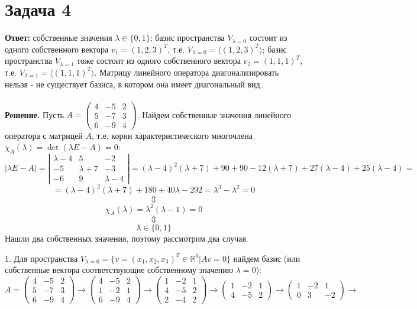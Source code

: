 \documentclass{article}
\begin{document}
\section*{Задача 4}
{\bf Ответ:} собственные значения $\lambda \in \{0, 1\}$; базис пространства $V_{\lambda=0}$ состоит из одного собственного вектора $v_1=(1,2,3)^T$, т.е.  $V_{\lambda=0}=\langle(1,2,3)^T\rangle$; базис пространства $V_{\lambda=1}$ тоже состоит из одного собственного вектора $v_2=(1, 1, 1)^T$, т.е. $V_{\lambda=1}=\langle(1,1,1)^T\rangle$.  Матрицу линейного оператора диагонализировать нельзя - не существует базиса, в котором она имеет диагональный вид.
\\
\\
{\bf Решение.} Пусть $A=\left(\begin{array}{rrr}4 & -5 & 2\\5 & -7 & 3\\6 & -9 & 4\end{array}\right)$. Найдем собственные значения линейного оператора с матрицей $A$, т.е. корни характеристического многочлена $\chi_A(\lambda)=\det(\lambda E-A)=0$:
$$|\lambda E - A|=\left|\begin{array}{rrr}\lambda-4 & 5 & -2\\-5 & \lambda+7 & -3\\-6 & 9 & \lambda-4\end{array}\right|=(\lambda-4)^2(\lambda+7)+90+90-12(\lambda+7)+27(\lambda-4)+25(\lambda-4)=$$
$$=(\lambda-4)^2(\lambda+7)+180+40\lambda-292=\lambda^3-\lambda^2=0$$
$$\Updownarrow$$
$$\chi_A(\lambda)=\lambda^2(\lambda-1)=0$$
$$\Updownarrow$$
$$\lambda \in \{0, 1\}$$
Нашли два собственных значения, поэтому рассмотрим два случая.
\par
1. Для пространства $V_{\lambda=0}=\{v=(x_1,x_2,x_3)^T\in\mathbb{R}^3|Av = 0\}$ найдем базис (или собственные вектора соответствующие собственному значению $\lambda=0$):
$$A=\left(\begin{array}{rrr}4 & -5 & 2\\5 & -7 & 3\\6 & -9 & 4\end{array}\right)\rightarrow\left(\begin{array}{rrr}4 & -5 & 2\\1 & -2 & 1\\6 & -9 & 4\end{array}\right)\rightarrow\left(\begin{array}{rrr}1 & -2 & 1\\4 & -5 & 2\\2 & -4 & 2\end{array}\right)\rightarrow\left(\begin{array}{rrr}1 & -2 & 1\\4 & -5 & 2\end{array}\right)\rightarrow\left(\begin{array}{rrr}1 & -2 & 1\\0 & 3 & -2\end{array}\right)\rightarrow$$
\end{document}
